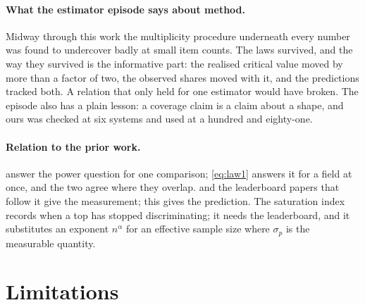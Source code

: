 \documentclass[10pt]{article}
\begin{document}
\paragraph{What the estimator episode says about method.} Midway through
this work the multiplicity procedure underneath every number was found to
undercover badly at small item counts. The laws survived, and the way they
survived is the informative part: the realised critical value moved by more
than a factor of two, the observed shares moved with it, and the
predictions tracked both. A relation that only held for one estimator would
have broken. The episode also has a plain lesson: a coverage claim is a
claim about a shape, and ours was checked at six systems and used at
a hundred and eighty-one.

\paragraph{Relation to the prior work.} \citet{card2020} answer the power
question for one comparison; \eqref{eq:law1} answers it for a field at once,
and the two agree where they overlap. \citet{mogstad2024} and the
leaderboard papers that follow it \citep{rankintervals} give the
measurement; this gives the prediction. The saturation index
\citep{saturation} records when a top has stopped discriminating; it needs
the leaderboard,
and it substitutes an exponent $n^{\alpha}$ for an effective sample size
where $\sigma_p$ is the measurable quantity.

\section{Limitations}
\end{document}
